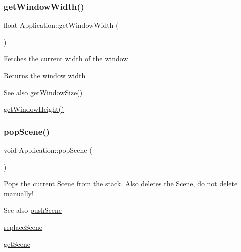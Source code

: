 \subsubsection{\texorpdfstring{getWindowWidth()}{getWindowWidth()}}
{\footnotesize\ttfamily float Application\+::get\+Window\+Width (\begin{DoxyParamCaption}{ }\end{DoxyParamCaption})}



Fetches the current width of the window. 

\begin{DoxyReturn}{Returns}
the window width 
\end{DoxyReturn}
\begin{DoxySeeAlso}{See also}
\mbox{\hyperlink{classsage_1_1Application_ac0fa1750ee8dcacc37cc9eaed72f12f9}{get\+Window\+Size()}} 

\mbox{\hyperlink{classsage_1_1Application_a20be3d592c9d2662051796420d0cd1d8}{get\+Window\+Height()}} 
\end{DoxySeeAlso}
\mbox{\label{classsage_1_1Application_a47b5bec61b3d93cbb4998b42d0d2ea47}} 
\subsubsection{\texorpdfstring{popScene()}{popScene()}}
{\footnotesize\ttfamily void Application\+::pop\+Scene (\begin{DoxyParamCaption}{ }\end{DoxyParamCaption})}



Pops the current \mbox{\hyperlink{classsage_1_1Scene}{Scene}} from the stack. Also deletes the \mbox{\hyperlink{classsage_1_1Scene}{Scene}}, do not delete manually! 

\begin{DoxySeeAlso}{See also}
\mbox{\hyperlink{classsage_1_1Application_ad69ba03dafa5afd69f2d6eb2a9d5fad5}{push\+Scene}} 

\mbox{\hyperlink{classsage_1_1Application_a49f5ce7574cf4f3053c4213d3177c76c}{replace\+Scene}} 

\mbox{\hyperlink{classsage_1_1Application_a4eaac489d4247bd184e17fa0aa6c858c}{get\+Scene}} 
\end{DoxySeeAlso}
\mbox{\label{classsage_1_1Application_ad69ba03dafa5afd69f2d6eb2a9d5fad5}} 
